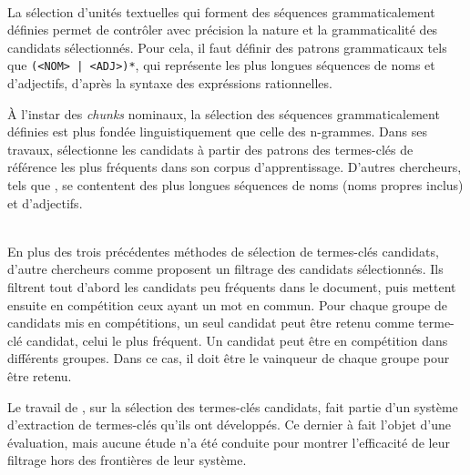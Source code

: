     \begin{example}
    \end{example}

    ~\\La sélection d'unités textuelles qui forment des séquences
    grammaticalement définies permet de contrôler
    avec précision la nature et la grammaticalité des candidats sélectionnés.
    Pour cela, il faut définir des patrons grammaticaux tels que \texttt{(<NOM>
    | <ADJ>)*}, qui représente les plus longues séquences de noms et
    d'adjectifs, d'après la syntaxe des expréssions rationnelles.

    À l'instar des \textit{chunks} nominaux, la sélection des séquences
    grammaticalement définies est plus fondée linguistiquement que celle des
    n-grammes. Dans ses travaux, 
    sélectionne les candidats à partir des patrons des termes-clés de référence
    les plus fréquents dans son corpus d'apprentissage. D'autres chercheurs,
    tels que , se contentent des plus longues
    séquences de noms (noms propres inclus) et d'adjectifs.

    \begin{example}
    \end{example}

    ~\\En plus des trois précédentes méthodes de sélection de termes-clés
    candidats, d'autre chercheurs comme
     proposent un filtrage
    des candidats sélectionnés.
    Ils filtrent tout d'abord les candidats peu fréquents dans le document, puis
    mettent ensuite en compétition ceux ayant un mot en commun. Pour chaque
    groupe de candidats mis en compétitions, un seul candidat peut être retenu
    comme terme-clé candidat, celui le plus fréquent. Un candidat peut être en
    compétition dans différents groupes. Dans ce cas, il doit être le
    \og{}vainqueur\fg{} de chaque groupe pour être retenu.

    Le travail de , sur la
    sélection des termes-clés candidats, fait partie d'un système d'extraction
    de termes-clés qu'ils ont développés. Ce dernier à fait l'objet d'une
    évaluation, mais aucune étude n'a été conduite pour montrer l'efficacité de
    leur filtrage hors des frontières de leur système.


